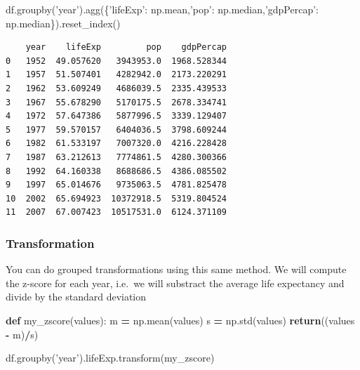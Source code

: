 \documentclass[
  letterpaper,
]{scrbook}
\newenvironment{Shaded}{\begin{snugshade}}{\end{snugshade}}
\newcommand{\ControlFlowTok}[1]{\textcolor[rgb]{0.13,0.29,0.53}{\textbf{#1}}}
\newcommand{\KeywordTok}[1]{\textcolor[rgb]{0.13,0.29,0.53}{\textbf{#1}}}
\newcommand{\NormalTok}[1]{#1}
\newcommand{\OperatorTok}[1]{\textcolor[rgb]{0.81,0.36,0.00}{\textbf{#1}}}
\newcommand{\StringTok}[1]{\textcolor[rgb]{0.31,0.60,0.02}{#1}}
\begin{document}
\begin{Shaded}
\begin{Highlighting}[]
\NormalTok{df.groupby(}\StringTok{'year'}\NormalTok{).agg(\{}\StringTok{'lifeExp'}\NormalTok{: np.mean,}\StringTok{'pop'}\NormalTok{: np.median,}\StringTok{'gdpPercap'}\NormalTok{: np.median\}).reset_index()}
\end{Highlighting}
\end{Shaded}

\begin{verbatim}
    year    lifeExp         pop    gdpPercap
0   1952  49.057620   3943953.0  1968.528344
1   1957  51.507401   4282942.0  2173.220291
2   1962  53.609249   4686039.5  2335.439533
3   1967  55.678290   5170175.5  2678.334741
4   1972  57.647386   5877996.5  3339.129407
5   1977  59.570157   6404036.5  3798.609244
6   1982  61.533197   7007320.0  4216.228428
7   1987  63.212613   7774861.5  4280.300366
8   1992  64.160338   8688686.5  4386.085502
9   1997  65.014676   9735063.5  4781.825478
10  2002  65.694923  10372918.5  5319.804524
11  2007  67.007423  10517531.0  6124.371109
\end{verbatim}

\hypertarget{transformation}{%
\subsubsection{Transformation}\label{transformation}}

You can do grouped transformations using this same method. We will compute the z-score for each year, i.e.~we will substract the average life expectancy and divide by the standard deviation

\begin{Shaded}
\begin{Highlighting}[]
\KeywordTok{def}\NormalTok{ my_zscore(values):}
\NormalTok{    m }\OperatorTok{=}\NormalTok{ np.mean(values)}
\NormalTok{    s }\OperatorTok{=}\NormalTok{ np.std(values)}
    \ControlFlowTok{return}\NormalTok{((values }\OperatorTok{-}\NormalTok{ m)}\OperatorTok{/}\NormalTok{s)}
\end{Highlighting}
\end{Shaded}

\begin{Shaded}
\begin{Highlighting}[]
\NormalTok{df.groupby(}\StringTok{'year'}\NormalTok{).lifeExp.transform(my_zscore)}
\end{Highlighting}
\end{Shaded}
\end{document}
